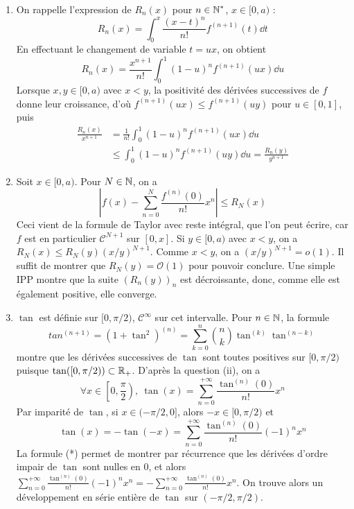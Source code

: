 \begin{solution}
	\begin{enumerate}
        \item On rappelle l'expression de $R_n(x)$ pour $n\in\operatorname{\mathbb N}^*$, $x\in[0,a)$ :
        \[
            R_n(x)=\int_0^x\frac{(x-t)^n}{n!}f^{(n+1)}(t)\dd t
        \]
        En effectuant le changement de variable $t=ux$, on obtient 
        \[
            R_n(x)=\frac{x^{n+1}}{n!}\int_0^1(1-u)^nf^{(n+1)}(ux)\dd u
        \]
        Lorsque $x,y\in[0,a)$ avec $x<y$, la positivité des dérivées successives de $f$ donne leur croissance,
        d'où $f^{(n+1)}(ux)\leq f^{(n+1)}(uy)$ pour $u\in[0,1]$, puis
        \begin{align*}
            \frac{R_n(x)}{x^{n+1}}&=\frac1{n!}\int_0^1(1-u)^nf^{(n+1)}(ux)\dd u\\
                                  &\leq \int_0^1(1-u)^nf^{(n+1)}(uy)\dd u=\frac{R_n(y)}{y^{n+1}}
        \end{align*}
        \item Soit $x\in[0,a)$. Pour $N\in\operatorname{\mathbb N}$, on a 
        \[
            \left|f(x)-\sum_{n=0}^N\frac{f^{(n)}(0)}{n!}x^n\right|\leq R_N(x)
        \]
        Ceci vient de la formule de Taylor avec reste intégral, que l'on peut écrire, car $f$ est en particulier $\mathcal C^{N+1}$ sur $[0,x]$.
        Si $y\in[0,a)$ avec $x<y$, on a $R_N(x)\leq R_N(y)(x/y)^{N+1}$.
        Comme $x<y$, on a $(x/y)^{N+1}=o(1)$. Il suffit de montrer que $R_N(y)=\mathcal O(1)$ pour pouvoir conclure.
        Une simple IPP montre que la suite $(R_n(y))_n$ est décroissante, donc, comme elle est également positive, elle converge.

        \item $\tan$ est définie sur $[0,\pi/2)$, $\mathcal C^\infty$ sur cet intervalle. 
        Pour $n\in\operatorname{\mathbb N}$, la formule
        \[
            tan^{(n+1)}=(1+\tan^2)^{(n)}=\sum_{k=0}^n\binom nk\tan^{(k)}\tan^{(n-k)}    \tag*{(*)}
        \]
        montre que les dérivées successives de $\tan$ sont toutes positives sur $[0,\pi/2)$ puisque $\tan([0,\pi/2))\subset\operatorname{\mathbb R}_+$.
        D'après la question (ii), on a 
        \[
            \forall x\in\left[0,\frac\pi2\right),\ \tan(x)=\sum_{n=0}^{+\infty}\frac{\tan^{(n)}(0)}{n!}x^n
        \]
        Par imparité de $\tan$, si $x\in(-\pi/2,0]$, alors $-x\in[0,\pi/2)$ et 
        \[
            \tan(x)=-\tan(-x)=\sum_{n=0}^{+\infty}\frac{\tan^{(n)}(0)}{n!}(-1)^nx^n   
        \]
        La formule (*) permet de montrer par récurrence que les dérivées d'ordre impair de $\tan$ sont nulles en 0, 
		et alors $\sum_{n=0}^{+\infty}\frac{\tan^{(n)}(0)}{n!}(-1)^nx^n=-\sum_{n=0}^{+\infty}\frac{\tan^{(n)}(0)}{n!}x^n$.
        On trouve alors un développement en série entière de $\tan$ sur $(-\pi/2,\pi/2)$.
    \end{enumerate}
\end{solution}
